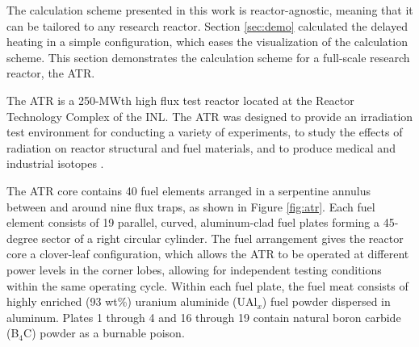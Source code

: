 

The calculation scheme presented in this work is reactor-agnostic, meaning that it can be tailored to any research reactor.
Section \ref{sec:demo} calculated the delayed heating in a simple configuration, which eases the visualization of the calculation scheme.
This section demonstrates the calculation scheme for a full-scale research reactor, the \gls*{ATR}.

The \gls*{ATR} is a 250-MWth high flux test reactor located at the Reactor Technology Complex of the \gls*{INL}.
The ATR was designed to provide an irradiation test environment for conducting a variety of experiments, to study the effects of radiation on reactor structural and fuel materials, and to produce medical and industrial isotopes \cite{ICSBEP, tomberlin_advanced_2002}.

The ATR core contains 40 fuel elements arranged in a serpentine annulus between and around nine flux traps, as shown in Figure \ref{fig:atr}.
Each fuel element consists of 19 parallel, curved, aluminum-clad fuel plates forming a 45-degree sector of a right circular cylinder.
The fuel arrangement gives the reactor core a clover-leaf configuration, which allows the \gls*{ATR} to be operated at different power levels in the corner lobes, allowing for independent testing conditions within the same operating cycle.
Within each fuel plate, the fuel meat consists of highly enriched (93 wt\%) uranium aluminide (UAl$_x$) fuel powder dispersed in aluminum.
Plates 1 through 4 and 16 through 19 contain natural boron carbide (B$_4$C) powder as a burnable poison.

